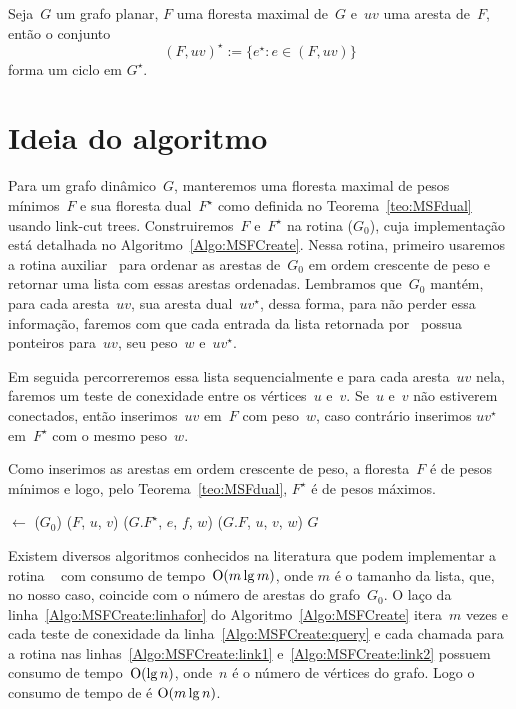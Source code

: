 \begin{theorem}
\label{teo:cutset}
Seja~$G$ um grafo planar, $F$ uma floresta maximal de~$G$ e~$uv$ uma aresta de~$F$, então o conjunto
$$
(F, uv)^\star := \{e^\star:e\in (F, uv)\}
$$
forma um ciclo em $G^\star$.
\end{theorem}


\section{Ideia do algoritmo}
Para um grafo dinâmico~$G$, manteremos uma floresta maximal de pesos mínimos~$F$ e sua floresta dual~$F^\star$ como definida no Teorema~\ref{teo:MSFdual} usando link-cut trees.
Construiremos~$F$ e~$F^\star$ na rotina \MSFCreate($G_0$), cuja implementação está detalhada no Algoritmo~\ref{Algo:MSFCreate}.
Nessa rotina, primeiro usaremos a rotina auxiliar~\order{} para ordenar as arestas de~$G_0$ em ordem crescente de peso e retornar uma lista com essas arestas ordenadas.
Lembramos que~$G_0$ mantém, para cada aresta~$uv$, sua aresta dual~$uv^\star$, dessa forma, para não perder essa informação, faremos com que cada entrada da lista retornada por~\order{}
possua ponteiros para~$uv$, seu peso~$w$ e~$uv^\star$.

Em seguida percorreremos essa lista sequencialmente e para cada aresta~$uv$ nela, faremos um teste de conexidade entre os vértices~$u$ e~$v$.
Se~$u$ e~$v$ não estiverem conectados, então inserimos~$uv$ em~$F$ com peso~$w$, caso contrário inserimos $uv^\star$ em~$F^\star$ com o mesmo peso~$w$.

Como inserimos as arestas em ordem crescente de peso, a floresta~$F$ é de pesos mínimos e logo, pelo Teorema~\ref{teo:MSFdual}, $F^\star$ é de pesos máximos.

\begin{algorithm}[htb]
\caption{\MSFCreate($n$, $G_0$)}
\label{Algo:MSFCreate}
\begin{algorithmic}[1]
\State {} $\gets$ \order($G_0$)
\label{Algo:MSFCreate:linhafor}
\If \linkcutQuery($F$, $u$, $v$)\label{Algo:MSFCreate:query}
\State \linkcutAddEdge($G$.$F^\star$, $e$, $f$, $w$)\label{Algo:MSFCreate:link1}
\Else
\State \linkcutAddEdge($G$.$F$, $u$, $v$, $w$)\label{Algo:MSFCreate:link2}
\EndIf
\EndFor
\State \Return $G$
\end{algorithmic}
\end{algorithm}

Existem diversos algoritmos conhecidos na literatura que podem implementar a rotina \order{}~\cite{CLRS} com consumo de tempo~$\mathrm{O}(m\lg m)$, onde $m$ é o tamanho da lista,
que, no nosso caso, coincide com o número de arestas do grafo~$G_0$.
O laço da linha~\ref{Algo:MSFCreate:linhafor} do Algoritmo~\ref{Algo:MSFCreate} itera~$m$ vezes e cada teste de conexidade da linha~\ref{Algo:MSFCreate:query} e cada chamada para a rotina  \linkcutAddEdge{} nas linhas~\ref{Algo:MSFCreate:link1} e~\ref{Algo:MSFCreate:link2} possuem consumo de tempo~$\mathrm{O}(\lg n)$, onde~$n$ é o número de vértices do grafo.
Logo o consumo de tempo de \MSFCreate{} é $\mathrm{O}(m\lg n)$.

